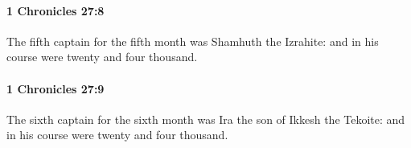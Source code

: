 		\paragraph{1 Chronicles 27:8} %
			\label{1CHRONICLES-27-8}

			The fifth captain for the fifth month was Shamhuth the Izrahite: and in his course were twenty and four thousand.


		\paragraph{1 Chronicles 27:9} %
			\label{1CHRONICLES-27-9}

			The sixth captain for the sixth month was Ira the son of Ikkesh the Tekoite: and in his course were twenty and four thousand.


